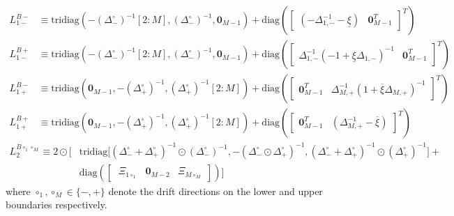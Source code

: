 \documentclass[11pt]{article}
\newcommand{\tridiag}{\ensuremath{\mathrm{tridiag}}}
\newcommand{\diag}{\ensuremath{\mathrm{diag}}}
\theoremstyle{definition}
\begin{document}
\begin{align}
{L}_{1-}^{B-} &\equiv
\tridiag \left(-(\Delta_-^\circ)^{-1}[2:M], (\Delta_-^\circ )^{-1}, \mathbf{0}_{M-1}  \right) +
\diag\left( 
\begin{bmatrix}
(-\Delta^{-1}_{1,-} - \underline{\xi} ) &
\mathbf{0}_{M-1}^T
\end{bmatrix}^T
\right) \\
{L}_{1-}^{B+} &\equiv
\tridiag \left(-(\Delta_-^\circ)^{-1}[2:M], (\Delta_-^\circ )^{-1}, \mathbf{0}_{M-1}  \right) +
\diag\left( 
\begin{bmatrix}
\Delta^{-1}_{1,-} (-1 + \underline{\xi} \Delta_{1,-})^{-1} &
\mathbf{0}_{M-1}^T
\end{bmatrix}^T
\right)
\end{align}
\begin{align}
{L}_{1+}^{B-} &\equiv
\tridiag \left(\mathbf{0}_{M-1}, -(\Delta_+^\circ )^{-1}, (\Delta_+^\circ)^{-1}[2:M]  \right) +
\diag\left( 
\begin{bmatrix}
\mathbf{0}_{M-1}^T &
\Delta^{-1}_{M,+} (1 + \overline{\xi} \Delta_{M,+})^{-1}
\end{bmatrix}^T
\right) \\
{L}_{1+}^{B+} &\equiv
\tridiag \left(\mathbf{0}_{M-1}, -(\Delta_+^\circ )^{-1}, (\Delta_+^\circ)^{-1}[2:M]  \right) +
\diag\left( 
\begin{bmatrix}
\mathbf{0}_{M-1}^T &
(\Delta^{-1}_{M,+} - \overline{\xi})
\end{bmatrix}^T
\right) 
\end{align}
\begin{align}
{L}_{2}^{B \circ_1 \circ_M } \equiv
2 \odot \Big[ & \text{tridiag} \Big[(\Delta_-^\circ + \Delta_+^\circ)^{-1} \odot (\Delta_{-}^\circ)^{-1}, 
-(\Delta_-^\circ \odot \Delta_+^\circ)^{-1},
(\Delta_-^\circ + \Delta_+^\circ)^{-1} \odot (\Delta_{+}^\circ)^{-1} \Big] + \\ & \diag\left(  
\begin{bmatrix} \
\Xi_{1 \circ_1} & \mathbf{0}_{M-2} & \Xi_{M \circ_M}
\end{bmatrix}
\right) \Big]
\end{align}
where $\circ_1, \circ_M \in \{-, +\}$ denote the drift directions on the lower and upper boundaries respectively.
\end{document}
